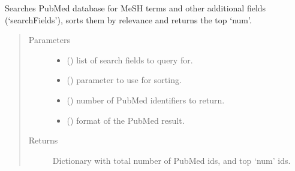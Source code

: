\documentclass[letterpaper,10pt,english]{sphinxmanual}
\begin{document}

\begin{fulllineitems}
\label{\detokenize{_autosummary/graphdb_builder:graphdb_builder.builder_utils.searchPubmed}}
Searches PubMed database for MeSH terms and other additional fields (‘searchFields’), sorts them by relevance and     returns the top ‘num’.
\begin{quote}\begin{description}
\item[{Parameters}] \leavevmode\begin{itemize}
\item {} 
 () \textendash{} list of search fields to query for.

\item {} 
 () \textendash{} parameter to use for sorting.

\item {} 
 () \textendash{} number of PubMed identifiers to return.

\item {} 
 () \textendash{} format of the PubMed result.

\end{itemize}

\item[{Returns}] \leavevmode
Dictionary with total number of PubMed ids, and top ‘num’ ids.

\end{description}\end{quote}

\end{fulllineitems}
\end{document}
